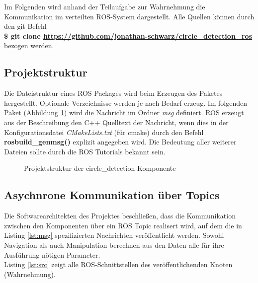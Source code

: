 \documentclass[9pt,a4paper,DIV=11]{scrartcl}
\begin{document}
Im Folgenden wird anhand der Teilaufgabe zur 
Wahrnehmung die Kommunikation im verteilten ROS-System dargestellt.
Alle Quellen können durch den git Befehl\\

\textbf{\$ git clone \url{https://github.com/jonathan-schwarz/circle_detection_ros}}\\

bezogen werden.

\subsection{Projektstruktur}

Die Dateistruktur eines ROS Packages wird beim Erzeugen des Paketes hergestellt. Optionale Verzeichnisse werden je nach Bedarf erzeug. Im folgenden Paket (Abbildung \ref{fig:dirtree}) wird die Nachricht im Ordner \textit{msg} definiert. ROS erzeugt aus der Beschreibung den C++ Quelltext der Nachricht, wenn dies in der Konfigurationsdatei \textit{CMakeLists.txt} (für cmake) durch den Befehl \textbf{rosbuild\_genmsg()} explizit angegeben wird. Die Bedeutung aller weiterer Dateien sollte durch die ROS Tutorials bekannt sein.

\begin{center}
\begin{figure}[H]

\caption{Projektstruktur der circle\_detection Komponente}
\label{fig:dirtree}
\end{figure}
\end{center}

\subsection{Asychnrone Kommunikation über Topics}\label{sec:src}

Die Softwarearchitekten des Projektes beschließen, dass die Kommunikation zwischen den Komponenten über ein ROS Topic realisert wird, auf dem die in Listing \ref{lst:msg} spezifizierten Nachrichten veröffentlicht werden. Sowohl Navigation als auch Manipulation berechnen aus den Daten alle für ihre Ausführung nötigen Parameter. \\

Listing \ref{lst:src} zeigt alle ROS-Schnittstellen des veröffentlichenden Knoten (Wahrnehmung). 
\end{document}
